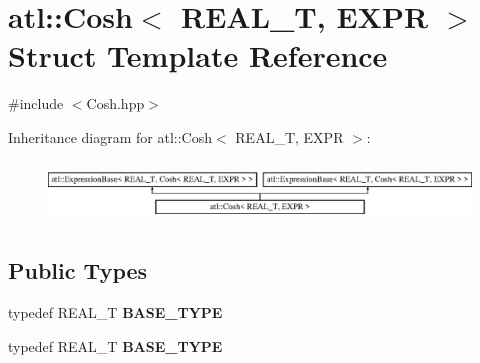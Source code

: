 \hypertarget{structatl_1_1_cosh}{\section{atl\+:\+:Cosh$<$ R\+E\+A\+L\+\_\+\+T, E\+X\+P\+R $>$ Struct Template Reference}
\label{structatl_1_1_cosh}
}


{\ttfamily \#include $<$Cosh.\+hpp$>$}

Inheritance diagram for atl\+:\+:Cosh$<$ R\+E\+A\+L\+\_\+\+T, E\+X\+P\+R $>$\+:\begin{figure}[H]
\begin{center}
\leavevmode
\includegraphics[height=1.604584cm]{structatl_1_1_cosh}
\end{center}
\end{figure}
\subsection*{Public Types}
\begin{DoxyCompactItemize}
\item 
\hypertarget{structatl_1_1_cosh_ab1e4552d7a61ab9bd55f6b2ca9120b89}{typedef R\+E\+A\+L\+\_\+\+T {\bfseries B\+A\+S\+E\+\_\+\+T\+Y\+P\+E}}\label{structatl_1_1_cosh_ab1e4552d7a61ab9bd55f6b2ca9120b89}

\item 
\hypertarget{structatl_1_1_cosh_ab1e4552d7a61ab9bd55f6b2ca9120b89}{typedef R\+E\+A\+L\+\_\+\+T {\bfseries B\+A\+S\+E\+\_\+\+T\+Y\+P\+E}}\label{structatl_1_1_cosh_ab1e4552d7a61ab9bd55f6b2ca9120b89}

\end{DoxyCompactItemize}
